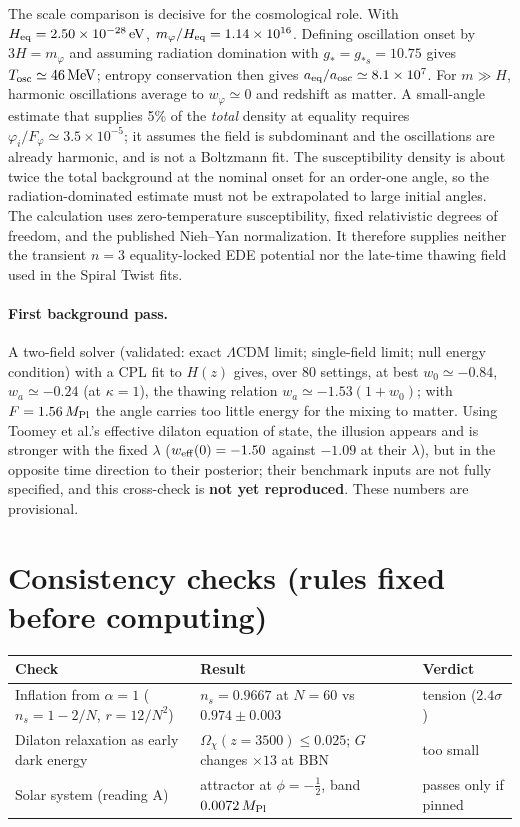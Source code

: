 \documentclass[11pt]{article}
\newcommand{\Mp}{M_{\rm Pl}}
\begin{document}
The scale comparison is decisive for the cosmological role. With $H_{\rm eq}=2.50\times10^{-28}\,\mathrm{eV}$,
$m_\varphi/H_{\rm eq}=1.14\times10^{16}$. Defining oscillation onset by $3H=m_\varphi$ and assuming radiation
domination with $g_*=g_{*s}=10.75$ gives $T_{\rm osc}\simeq46\,\mathrm{MeV}$; entropy conservation then gives
$a_{\rm eq}/a_{\rm osc}\simeq8.1\times10^7$. For $m\gg H$, harmonic oscillations average to $w_\varphi\simeq0$ and
redshift as matter. A small-angle estimate that supplies 5\% of the \emph{total} density at equality requires
$\varphi_i/F_\varphi\simeq3.5\times10^{-5}$; it assumes the field is subdominant and the oscillations are already
harmonic, and is not a Boltzmann fit. The susceptibility density is about twice the total background at the
nominal onset for an order-one angle, so the radiation-dominated estimate must not be extrapolated to large initial
angles. The calculation uses zero-temperature susceptibility, fixed relativistic degrees of freedom, and the
published Nieh--Yan normalization. It therefore supplies neither the transient $n=3$ equality-locked EDE potential
nor the late-time thawing field used in the Spiral Twist fits.

\paragraph{First background pass.} A two-field solver (validated: exact $\Lambda$CDM limit; single-field limit;
null energy condition) with a CPL fit to $H(z)$ gives, over 80 settings, at best $w_0\simeq-0.84$, $w_a\simeq-0.24$
(at $\kappa=1$), the thawing relation $w_a\simeq-1.53(1+w_0)$; with $F=1.56\,\Mp$ the angle carries too little
energy for the mixing to matter. Using Toomey et al.'s effective dilaton equation of state, the illusion appears and
is stronger with the fixed $\lambda$ ($w_{\rm eff}(0)=-1.50$ against $-1.09$ at their $\lambda$), but in the opposite
time direction to their posterior; their benchmark inputs are not fully specified, and this cross-check is
\textbf{not yet reproduced}. These numbers are provisional.

\section{Consistency checks (rules fixed before computing)}
\begin{center}\small
\begin{tabular}{p{}p{}p{}}
\toprule
Check & Result & Verdict \\
\midrule
Inflation from $\alpha=1$ ($n_s=1-2/N$, $r=12/N^2$) & $n_s=0.9667$ at $N=60$ vs $0.974\pm0.003$ & tension ($2.4\sigma$) \\
Dilaton relaxation as early dark energy & $\Omega_\chi(z{=}3500)\le0.025$; $G$ changes $\times13$ at BBN & too small \\
Solar system (reading A) & attractor at $\phi=-\tfrac12$, band $0.0072\,\Mp$ & passes only if pinned \\
\bottomrule
\end{tabular}
\end{center}
\end{document}
